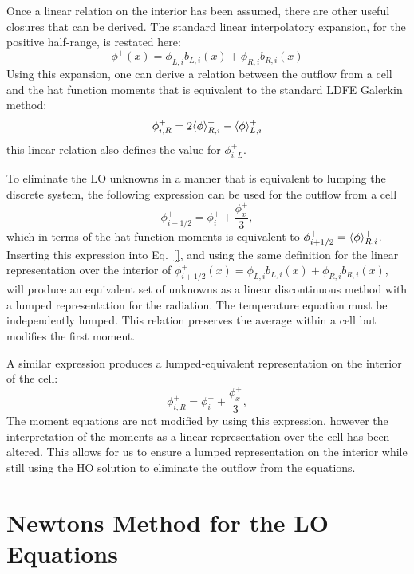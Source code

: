 Once a linear relation on the interior has been assumed, there are other useful closures that can be
derived.  The standard linear interpolatory expansion, for the positive half-range, is restated here:
\begin{equation}
\phi^+(x) = \phi^+_{L,i} b_{L,i}(x) + \phi^+_{R,i} b_{R,i}(x)
\end{equation}
Using this expansion, one can derive a relation between the outflow from a cell and the
hat function moments that is equivalent to the standard LDFE Galerkin method:
\begin{equation}
    \phi_{i,R}^+ = 2 \langle \phi \rangle_{R,i}^+ - \langle \phi \rangle_{L,i}^+
\end{equation}
this linear relation also defines the value for $\phi_{i,L}^+$.

To eliminate the LO unknowns in a manner that is equivalent to lumping the discrete system, the
following expression can be used for the outflow from a cell
\begin{equation}
    \phi_{i+1/2}^+ = \phi_i^+ + \frac{\phi_x^+}{3},
\end{equation}
which in terms of the hat function moments is equivalent to $\phi_{i+1/2}^+ =
\langle \phi \rangle_{R,i}^+$.  Inserting this expression into Eq.~\eqref{}, and using the same
definition for the linear representation over the interior of $\phi_{i+1/2}^+(x) =
\phi_{L,i} b_{L,i}(x) + \phi_{R,i} b_{R,i}(x)$, will produce an equivalent set of unknowns
as a linear discontinuous method with a lumped representation for the radiation.  The
temperature equation must be independently lumped. This
relation preserves the average within a cell but modifies the first moment.  

A similar expression produces a lumped-equivalent representation on the interior of the cell:
\begin{equation}
    \phi_{i,R}^+ = \phi_i^+ + \frac{\phi_x^+}{3},
\end{equation}
The moment equations are not modified by using this expression, however the interpretation
of the moments as a linear representation over the cell has been altered.  This allows for
us to ensure a lumped representation on the interior while still using the HO solution to
eliminate the outflow from the equations.


\section{Newtons Method for the LO Equations}
\label{app:lo_newton}

